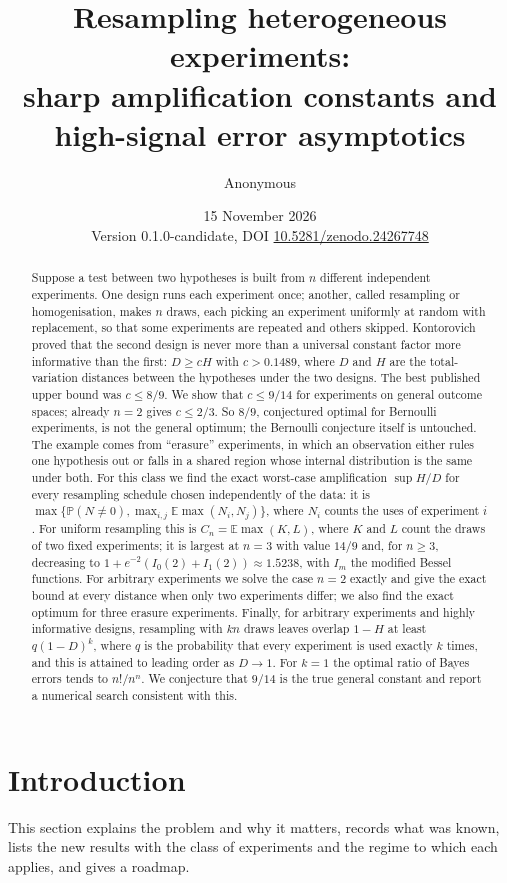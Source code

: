 \documentclass[11pt,a4paper]{article}
\title{Resampling heterogeneous experiments:\\ sharp amplification constants and high-signal error asymptotics}
\author{Anonymous}
\date{15 November 2026\\[2pt]\small Version 0.1.0-candidate, DOI \href{https://doi.org/10.5281/zenodo.24267748}{10.5281/zenodo.24267748}}
\theoremstyle{definition}\newtheorem{definition}[theorem]{Definition}
\theoremstyle{remark}\newtheorem{remark}[theorem]{Remark}
\newcommand{\E}{\mathbb E}
\newcommand{\PP}{\mathbb P}
\begin{document}
\maketitle
\begin{abstract}
Suppose a test between two hypotheses is built from $n$ different independent experiments. One design runs each experiment once; another, called resampling or homogenisation, makes $n$ draws, each picking an experiment uniformly at random with replacement, so that some experiments are repeated and others skipped. Kontorovich proved that the second design is never more than a universal constant factor more informative than the first: $D\ge cH$ with $c>0.1489$, where $D$ and $H$ are the total-variation distances between the hypotheses under the two designs. The best published upper bound was $c\le8/9$. We show that $c\le9/14$ for experiments on general outcome spaces; already $n=2$ gives $c\le2/3$. So $8/9$, conjectured optimal for Bernoulli experiments, is not the general optimum; the Bernoulli conjecture itself is untouched. The example comes from ``erasure'' experiments, in which an observation either rules one hypothesis out or falls in a shared region whose internal distribution is the same under both. For this class we find the exact worst-case amplification $\sup H/D$ for every resampling schedule chosen independently of the data: it is $\max\{\PP(N\ne0),\max_{i,j}\E\max(N_i,N_j)\}$, where $N_i$ counts the uses of experiment $i$. For uniform resampling this is $C_n=\E\max(K,L)$, where $K$ and $L$ count the draws of two fixed experiments; it is largest at $n=3$ with value $14/9$ and, for $n\ge3$, decreasing to $1+e^{-2}(I_0(2)+I_1(2))\approx1.5238$, with $I_m$ the modified Bessel functions. For arbitrary experiments we solve the case $n=2$ exactly and give the exact bound at every distance when only two experiments differ; we also find the exact optimum for three erasure experiments. Finally, for arbitrary experiments and highly informative designs, resampling with $kn$ draws leaves overlap $1-H$ at least $q(1-D)^k$, where $q$ is the probability that every experiment is used exactly $k$ times, and this is attained to leading order as $D\to1$. For $k=1$ the optimal ratio of Bayes errors tends to $n!/n^n$. We conjecture that $9/14$ is the true general constant and report a numerical search consistent with this.
\end{abstract}

\section{Introduction}\label{sec:intro}
This section explains the problem and why it matters, records what was known, lists the new results with the class of experiments and the regime to which each applies, and gives a roadmap.
\end{document}
